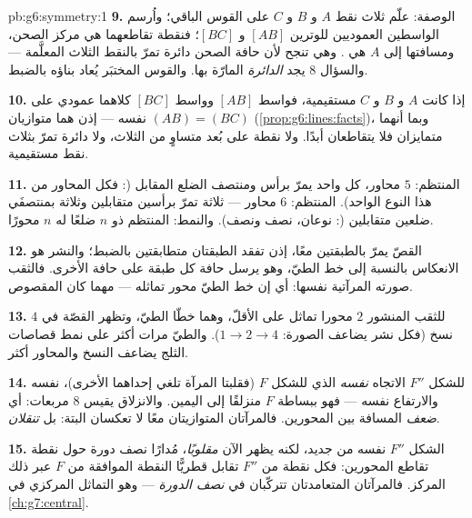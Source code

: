 \begin{solution}{pb:g6:symmetry:1}
\textbf{9.} الوصفة: علّم ثلاث نقط $A$ و $B$ و $C$ على
القوس الباقي؛ واُرسم الواسطين العموديين للوترين
$[AB]$ و $[BC]$؛ فنقطة تقاطعهما هي مركز
الصحن، ومسافتها إلى $A$ هي . وهي تنجح لأن
حافة الصحن دائرة تمرّ بالنقط الثلاث المعلَّمة ---
والسؤال 8 يجد \emph{الدائرة} المارّة بها. والقوس
المختبَر يُعاد بناؤه بالضبط.

\textbf{10.} إذا كانت $A$ و $B$ و $C$ مستقيمية، فواسط
$[AB]$ وواسط $[BC]$ كلاهما عمودي على
 $(AB) = (BC)$ نفسه --- إذن هما متوازيان
(\cref{prop:g6:lines:facts})، وبما أنهما متمايزان فلا يتقاطعان أبدًا.
ولا نقطة على بُعد متساوٍ من الثلاث، ولا دائرة تمرّ
بثلاث نقط مستقيمية.

\textbf{11.}  المنتظم: $5$ محاور، كل واحد يمرّ برأس
ومنتصف الضلع المقابل (: فكل المحاور
من هذا النوع الواحد).  المنتظم: $6$ محاور --- ثلاثة تمرّ
برأسين متقابلين وثلاثة بمنتصفَي ضلعين متقابلين
(: نوعان، نصف ونصف). والنمط: 
المنتظم ذو $n$ ضلعًا له $n$ محورًا.

\textbf{12.} القصّ يمرّ بالطبقتين معًا، إذن
تفقد الطبقتان  متطابقتين بالضبط؛ والنشر هو
الانعكاس بالنسبة إلى خط الطيّ، وهو يرسل حافة كل طبقة
على حافة الأخرى. فالثقب صورته المرآتية نفسها: أي إن خط
الطيّ محور تماثله --- مهما كان المقصوص.

\textbf{13.} للثقب المنشور $2$ محورا تماثل على
الأقلّ، وهما خطّا الطيّ، وتظهر القصّة في $4$ نسخ
(فكل نشر يضاعف الصورة: $1 \to 2 \to 4$). والطيّ
مرات أكثر على نمط قصاصات الثلج يضاعف النسخ والمحاور
أكثر.

\textbf{14.} للشكل $F''$ الاتجاه \emph{نفسه} الذي للشكل $F$ (فقلبتا
المرآة تلغي إحداهما الأخرى)،  نفسه والارتفاع
نفسه --- فهو ببساطة $F$ منزلقًا إلى اليمين. والانزلاق
يقيس $8$ مربعات: أي \emph{ضعف} المسافة بين
المحورين. فالمرآتان المتوازيتان معًا لا تعكسان
البتة: بل \emph{تنقلان}.

\textbf{15.} الشكل $F''$  نفسه من جديد، لكنه يظهر الآن
\emph{مقلوبًا}، مُدارًا نصف دورة حول نقطة
تقاطع المحورين: فكل نقطة من $F''$ تقابل قطريًّا
النقطة الموافقة من $F$ عبر ذلك المركز.
فالمرآتان المتعامدتان تتركّبان في \emph{نصف الدورة} ---
وهو التماثل المركزي في \cref{ch:g7:central}.
\end{solution}
